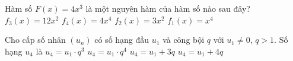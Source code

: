 \begin{ex}%
	Hàm số $F(x)=4x^3$ là một nguyên hàm của hàm số nào sau đây?
	\choice
		{\True $f_3(x)=12x^2$}
		{$f_4(x)=4x^4$}
		{$f_2(x)=3x^2$}
		{$f_1(x)=x^4$}
\end{ex}

\begin{ex}%
	Cho cấp số nhân $(u_n)$ có số hạng đầu $u_1$ và công bội $q$ với $u_1 \neq 0$, $q>1$. Số hạng $u_4$ là
	\choice
		{\True $u_4=u_1\cdot q^3$}
		{$u_4=u_1\cdot q^4$}
		{$u_4=u_1+3q$}
		{$u_4=u_1+4q$}
\end{ex}


